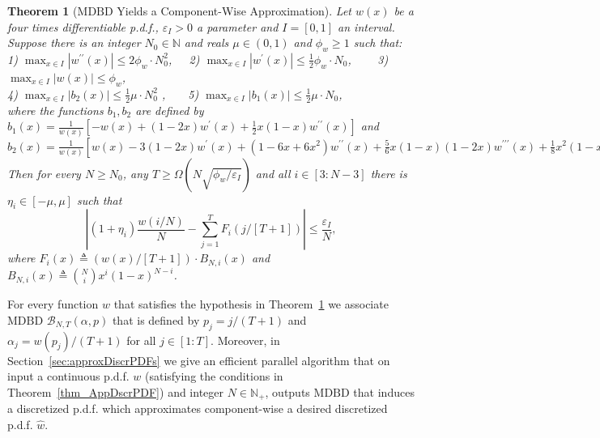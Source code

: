 \documentclass[11pt]{article}
\newcommand{\phiw}{\phi_{w}}
\newcommand{\MDBD}{\mathrm{MDBD}}
\newcommand{\BNTap}{\mathcal{B}_{N,T}(\alpha,p)}
\newcommand{\hw}{\widehat{w}}
\newcommand{\prm}{\prime}
\newcommand{\N}{\mathbb{N}}
\newcommand{\eps}{\epsilon}
\renewcommand{\leq}{\leqslant}
\renewcommand{\geq}{\geqslant}
\renewcommand{\eps}{\varepsilon}
\newtheorem{thm}{Theorem}  \newtheorem{fact}[thm]{Fact}
\numberwithin{thm}{section}
\begin{document}
\begin{thm}[$\MDBD$ Yields a Component-Wise Approximation]\label{thmMDBD}
Let $w(x)$ be a four times differentiable p.d.f., $\eps_{I}>0$ a parameter and $I=[0,1]$ an interval. Suppose there is an integer $N_{0}\in\N$ and reals $\mu\in(0,1)$ and $\phiw\geq1$ such that:\\
1) $\max_{x\in I}|w^{\prm\prm}(x)|\leq 2\phiw \cdot N_{0}^{2}$,$\,\,\,\,\,\,\,$ 2) $\max_{x\in I}|w^{\prm}(x)|\leq\frac{1}{2}\phiw\cdot N_{0}$,$\,\,\,\,\,\,\,\,\,\,\,\,\,\,$3) $\max_{x\in I}|w(x)|\leq \phiw$,\\
4) $\max_{x\in I}|b_{2}(x)|\leq\frac{1}{2}\mu\cdot N_{0}^{2}$ ,$\quad\,\,\,\,\,\,$5) $\max_{x\in I}|b_{1}(x)|\leq\frac{1}{2}\mu\cdot N_{0}$,\\
where the functions $b_1,b_2$ are defined by $b_{1}(x)=\frac{1}{w(x)}[-w(x)+(1-2x)w^{\prm}(x)+\frac{1}{2}x(1-x)w^{\prm\prm}(x)]$
and $b_{2}(x)=\frac{1}{w(x)}[w(x)-3(1-2x)w^{\prm}(x)+(1-6x+6x^{2})w^{\prm\prm}(x)+\frac{5}{6}x(1-x)(1-2x)w^{\prm\prm\prm}(x)+\frac{1}{8}x^{2}(1-x)^{2}w^{\prm\mathrm{v}}(x)].$
Then for every $N\geq N_{0}$, any $T\geq\Omega(N\sqrt{\phiw/\eps_{I}})$ and all $i\in[3:N-3]$ there is $\eta_{i}\in[-\mu,\mu]$ such that
\begin{equation}\label{eq:fin_Approx}
\left|(1+\eta_{i})\frac{w(i/N)}{N} - \sum_{j=1}^{T}F_{i}(j/[T+1])\right| \leq \frac{\eps_{I}}{N},
\end{equation}
where $F_{i}(x)\triangleq (w(x)/[T+1])\cdot B_{N,i}(x)$ and $B_{N,i}(x)\triangleq{N \choose i}x^{i}(1-x)^{N-i}$.
\end{thm}

For every function $w$ that satisfies the hypothesis in Theorem~\ref{thmMDBD} we associate $\MDBD$ $\BNTap$ that is defined by $p_j=j/(T+1)$ and $\alpha_j=w(p_j)/(T+1)$ for all $j\in[1:T]$. Moreover, in Section~\ref{sec:approxDiscrPDFs} we give an efficient parallel algorithm that on input a continuous p.d.f. $w$ (satisfying the conditions in Theorem~\ref{thm_AppDscrPDF}) and integer $N\in\N_+$, outputs $\MDBD$ that induces a discretized p.d.f. which approximates component-wise a desired discretized p.d.f. $\hw$.
\end{document}
